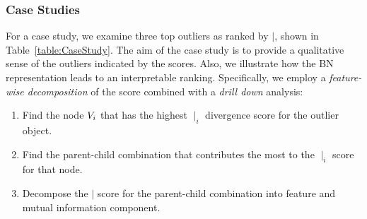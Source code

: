 \documentclass[conference]{IEEEtran}
\begin{document}
								
								
								
								
								
								
								
								
								\subsubsection{Case Studies} For a case study, we examine three top outliers as ranked by $\mid$, shown in Table~\ref{table:CaseStudy}. 
								The aim of the case study is to provide a qualitative sense of the outliers indicated by the scores. Also, we illustrate how the BN representation leads to an interpretable ranking. 
							Specifically, we employ a {\em feature-wise decomposition} of the score combined with a {\em drill down} analysis: 
							
\begin{enumerate}
\item Find the node $V_{i}$ that has the highest $\mid_{i}$ divergence score for the outlier object. 
\item Find the parent-child combination that contributes the most to the $\mid_{i}$ score for that node.
\item Decompose the $\mid$ score for the parent-child combination into feature and mutual information component. 
\end{enumerate}
	
\end{document}
